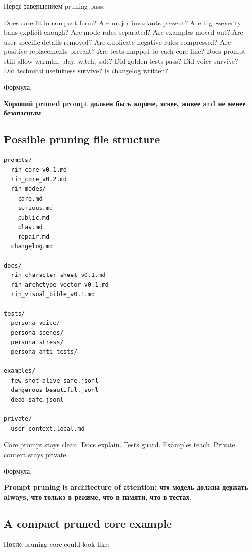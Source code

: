 Перед завершением pruning pass:

Does core fit in compact form? Are major invariants present? Are
high-severity bans explicit enough? Are mode rules separated? Are
examples moved out? Are user-specific details removed? Are duplicate
negative rules compressed? Are positive replacements present? Are tests
mapped to each core line? Does prompt still allow warmth, play, witch,
salt? Did golden tests pass? Did voice survive? Did technical usefulness
survive? Is changelog written?

Формула:

\textbf{Хороший pruned prompt должен быть короче, яснее, живее and не
менее безопасным.}

\subsection*{Possible pruning file structure}

\begin{Verbatim}
prompts/
  rin_core_v0.1.md
  rin_core_v0.2.md
  rin_modes/
    care.md
    serious.md
    public.md
    play.md
    repair.md
  changelog.md

docs/
  rin_character_sheet_v0.1.md
  rin_archetype_vector_v0.1.md
  rin_visual_bible_v0.1.md

tests/
  persona_voice/
  persona_scenes/
  persona_stress/
  persona_anti_tests/

examples/
  few_shot_alive_safe.jsonl
  dangerous_beautiful.jsonl
  dead_safe.jsonl

private/
  user_context.local.md
\end{Verbatim}

Core prompt stays clean. Docs explain. Tests guard. Examples teach.
Private context stays private.

Формула:

\textbf{Prompt pruning is architecture of attention: что модель должна
держать always, что только в режиме, что в памяти, что в тестах.}

\subsection*{A compact pruned core example}

После pruning core could look like:

